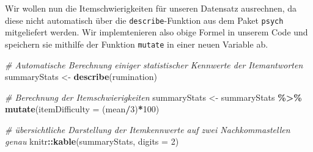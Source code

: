 \documentclass[
  ngerman,
]{book}
\newenvironment{Shaded}{\begin{snugshade}}{\end{snugshade}}
\newcommand{\AttributeTok}[1]{\textcolor[rgb]{0.13,0.29,0.53}{#1}}
\newcommand{\CommentTok}[1]{\textcolor[rgb]{0.56,0.35,0.01}{\textit{#1}}}
\newcommand{\DecValTok}[1]{\textcolor[rgb]{0.00,0.00,0.81}{#1}}
\newcommand{\FunctionTok}[1]{\textcolor[rgb]{0.13,0.29,0.53}{\textbf{#1}}}
\newcommand{\NormalTok}[1]{#1}
\newcommand{\OtherTok}[1]{\textcolor[rgb]{0.56,0.35,0.01}{#1}}
\newcommand{\SpecialCharTok}[1]{\textcolor[rgb]{0.81,0.36,0.00}{\textbf{#1}}}
\begin{document}
Wir wollen nun die Itemschwierigkeiten für unseren Datensatz ausrechnen, da diese nicht automatisch über die \texttt{describe}-Funktion aus dem Paket \texttt{psych} mitgeliefert werden. Wir implemtenieren also obige Formel in unserem Code und speichern sie mithilfe der Funktion \texttt{mutate} in einer neuen Variable ab.

\begin{Shaded}
\begin{Highlighting}[]
\CommentTok{\# Automatische Berechnung einiger statistischer Kennwerte der Itemantworten}
\NormalTok{summaryStats }\OtherTok{\textless{}{-}} \FunctionTok{describe}\NormalTok{(rumination)}

\CommentTok{\# Berechnung der Itemschwierigkeiten}
\NormalTok{summaryStats }\OtherTok{\textless{}{-}}\NormalTok{ summaryStats }\SpecialCharTok{\%\textgreater{}\%}
  \FunctionTok{mutate}\NormalTok{(}\AttributeTok{itemDifficulty =}\NormalTok{ (mean}\SpecialCharTok{/}\DecValTok{3}\NormalTok{)}\SpecialCharTok{*}\DecValTok{100}\NormalTok{)}

\CommentTok{\# übersichtliche Darstellung der Itemkennwerte auf zwei Nachkommastellen genau}
\NormalTok{knitr}\SpecialCharTok{::}\FunctionTok{kable}\NormalTok{(summaryStats, }\AttributeTok{digits =} \DecValTok{2}\NormalTok{)}
\end{Highlighting}
\end{Shaded}
\end{document}
